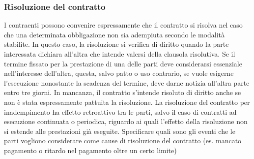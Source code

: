 \subsubsection{Risoluzione del contratto}
I contraenti possono convenire espressamente che il contratto si risolva nel caso che una determinata obbligazione non sia adempiuta secondo le modalità stabilite.
In questo caso, la risoluzione si verifica di diritto quando la parte interessata dichiara all'altra che intende valersi della clausola risolutiva.
Se il termine fissato per la prestazione di una delle parti deve considerarsi essenziale nell'interesse dell'altra, questa, salvo patto o uso contrario,
se vuole esigerne l'esecuzione nonostante la scadenza del termine, deve darne notizia all'altra parte entro tre giorni. In mancanza, il contratto s'intende
risoluto di diritto anche se non è stata espressamente pattuita la risoluzione.\newline
La risoluzione del contratto per inadempimento ha effetto retroattivo tra le parti, salvo il caso di contratti ad esecuzione continuata o periodica,
riguardo ai quali l'effetto della risoluzione non si estende alle prestazioni già eseguite.\newline
Specificare quali sono gli eventi che le parti vogliono considerare come cause di risoluzione del contratto (es. mancato pagamento o ritardo nel pagamento oltre un certo limite)
